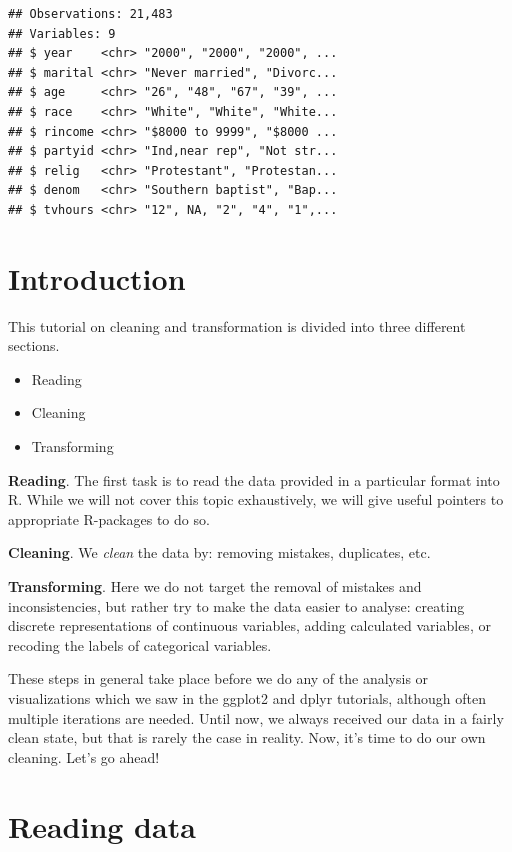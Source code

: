 \documentclass[]{tufte-book}
\providecommand{\tightlist}{%
  \setlength{\itemsep}{0pt}\setlength{\parskip}{0pt}}
\begin{document}
\begin{verbatim}
## Observations: 21,483
## Variables: 9
## $ year    <chr> "2000", "2000", "2000", ...
## $ marital <chr> "Never married", "Divorc...
## $ age     <chr> "26", "48", "67", "39", ...
## $ race    <chr> "White", "White", "White...
## $ rincome <chr> "$8000 to 9999", "$8000 ...
## $ partyid <chr> "Ind,near rep", "Not str...
## $ relig   <chr> "Protestant", "Protestan...
## $ denom   <chr> "Southern baptist", "Bap...
## $ tvhours <chr> "12", NA, "2", "4", "1",...
\end{verbatim}

\chapter*{Introduction}\label{introduction}

This tutorial on cleaning and transformation is divided into three
different sections.

\begin{itemize}
\tightlist
\item
  Reading
\item
  Cleaning
\item
  Transforming
\end{itemize}

\textbf{Reading}. The first task is to read the data provided in a
particular format into R. While we will not cover this topic
exhaustively, we will give useful pointers to appropriate R-packages to
do so.

\textbf{Cleaning}. We \emph{clean} the data by: removing mistakes,
duplicates, etc.

\textbf{Transforming}. Here we do not target the removal of mistakes and
inconsistencies, but rather try to make the data easier to analyse:
creating discrete representations of continuous variables, adding
calculated variables, or recoding the labels of categorical variables.

These steps in general take place before we do any of the analysis or
visualizations which we saw in the ggplot2 and dplyr tutorials, although
often multiple iterations are needed. Until now, we always received our
data in a fairly clean state, but that is rarely the case in reality.
Now, it's time to do our own cleaning. Let's go ahead!

\chapter{Reading data}\label{reading-data}
\end{document}
